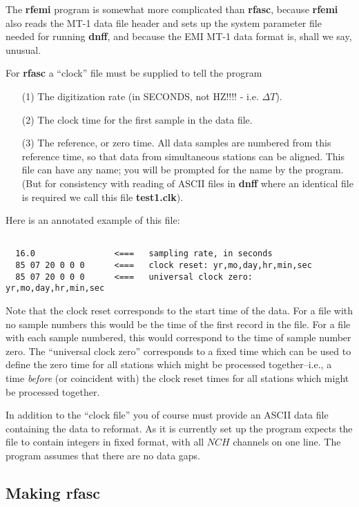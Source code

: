 The {\bf rfemi} program is somewhat more 
complicated than {\bf rfasc}, because
{\bf rfemi} also reads the MT-1 
data file header and sets up the system parameter
file needed for running {\bf dnff}, and because the
EMI MT-1 data format is, shall we say, unusual.

For {\bf rfasc} a ``clock'' file must be supplied to tell the program
\begin{itemize}
\item[(1)]
The digitization rate (in SECONDS, not HZ!!!! - i.e. $\Delta T$).
\item[(2)]
The clock time for the first sample in the data file.
\item[(3)]
The reference, or zero time. All data samples are numbered from
this reference time, so that data from simultaneous stations
can be aligned.
This file can have any name; you will be prompted for the name by
the program.  (But for consistency with reading of ASCII
files in {\bf dnff} where an identical file is required we 
call this file {\bf test1.clk}).

\end{itemize}

Here is an annotated example of this file:
\small

\begin{verbatim}

  16.0                <===   sampling rate, in seconds
  85 07 20 0 0 0      <===   clock reset: yr,mo,day,hr,min,sec
  85 07 20 0 0 0      <===   universal clock zero: yr,mo,day,hr,min,sec
\end{verbatim}
\normalsize

Note that the clock reset corresponds to the start time of the data.
For a file with no sample numbers this would be the
time of the first record in the file.  For a file with each sample
numbered, this would correspond to the time of sample number zero.
The ``universal clock zero'' corresponds to a fixed time which can
be used to define the zero time for all stations which might be
processed together--i.e., a time {\it before} (or coincident
with)  the clock reset
times for all stations which might be processed together.

In addition to the ``clock file'' you of course must provide an ASCII
data file containing the data to reformat.  As it is currently set up
the program expects the file to contain integers in fixed format,
with all $NCH$ channels on one line.
The program assumes that there are no data gaps.  

\subsection{Making rfasc}

